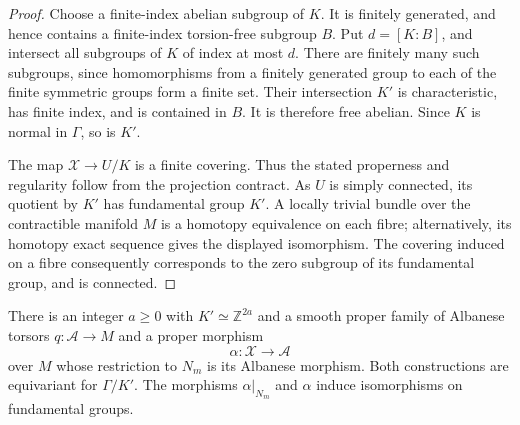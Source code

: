 \begin{proof}
Choose a finite-index abelian subgroup of $K$.  It is finitely generated, and hence contains a finite-index torsion-free subgroup $B$.  Put $d=[K:B]$, and intersect all subgroups of $K$ of index at most $d$. There are finitely many such subgroups, since homomorphisms from a finitely generated group to each of the finite symmetric groups form a finite set.  Their intersection $K'$ is characteristic, has finite index, and is contained in $B$.  It is therefore free abelian. Since $K$ is normal in $\Gamma$, so is $K'$.

The map $\mathcal{X}\to U/K$ is a finite covering.  Thus the stated properness and regularity follow from the projection contract.  As $U$ is simply connected, its quotient by $K'$ has fundamental group $K'$.  A locally trivial bundle over the contractible manifold $M$ is a homotopy equivalence on each fibre; alternatively, its homotopy exact sequence gives the displayed isomorphism.  The covering induced on a fibre consequently corresponds to the zero subgroup of its fundamental group, and is connected.
\end{proof}

\begin{lemma}
\label{lem:cmp-albanese}
There is an integer $a\geq0$ with $K'\simeq\mathbb{Z}^{2a}$ and a smooth proper family of Albanese torsors $q:\mathcal{A}\to M$ and a proper morphism
\[
                 \alpha:\mathcal{X}\longrightarrow\mathcal{A}
\]
over $M$ whose restriction to $N_m$ is its Albanese morphism.  Both constructions are equivariant for $\Gamma/K'$.  The morphisms $\alpha|_{N_m}$ and $\alpha$ induce isomorphisms on fundamental groups.
\end{lemma}

